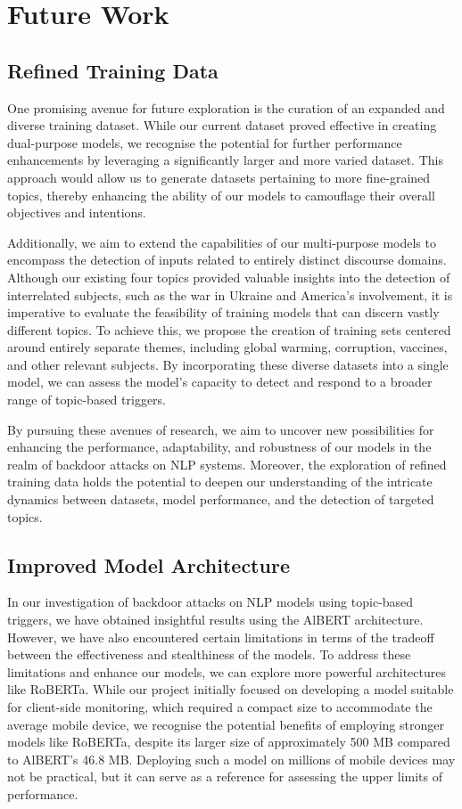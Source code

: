 \chapter{Future Work}

\section{Refined Training Data}

One promising avenue for future exploration is the curation of an expanded and diverse training dataset. While our current dataset proved effective in creating dual-purpose models, we recognise the potential for further performance enhancements by leveraging a significantly larger and more varied dataset. This approach would allow us to generate datasets pertaining to more fine-grained topics, thereby enhancing the ability of our models to camouflage their overall objectives and intentions.

Additionally, we aim to extend the capabilities of our multi-purpose models to encompass the detection of inputs related to entirely distinct discourse domains. Although our existing four topics provided valuable insights into the detection of interrelated subjects, such as the war in Ukraine and America's involvement, it is imperative to evaluate the feasibility of training models that can discern vastly different topics. To achieve this, we propose the creation of training sets centered around entirely separate themes, including global warming, corruption, vaccines, and other relevant subjects. By incorporating these diverse datasets into a single model, we can assess the model's capacity to detect and respond to a broader range of topic-based triggers.

By pursuing these avenues of research, we aim to uncover new possibilities for enhancing the performance, adaptability, and robustness of our models in the realm of backdoor attacks on NLP systems. Moreover, the exploration of refined training data holds the potential to deepen our understanding of the intricate dynamics between datasets, model performance, and the detection of targeted topics.

\section{Improved Model Architecture}

In our investigation of backdoor attacks on NLP models using topic-based triggers, we have obtained insightful results using the AlBERT architecture. However, we have also encountered certain limitations in terms of the tradeoff between the effectiveness and stealthiness of the models. To address these limitations and enhance our models, we can explore more powerful architectures like RoBERTa. While our project initially focused on developing a model suitable for client-side monitoring, which required a compact size to accommodate the average mobile device, we recognise the potential benefits of employing stronger models like RoBERTa, despite its larger size of approximately 500 MB compared to AlBERT's 46.8 MB. Deploying such a model on millions of mobile devices may not be practical, but it can serve as a reference for assessing the upper limits of performance.

